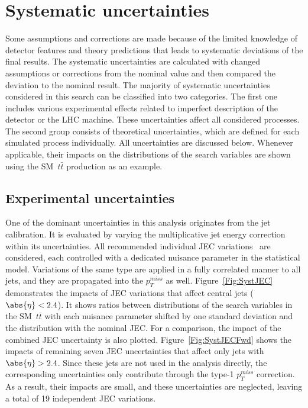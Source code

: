\section{Systematic uncertainties}
\label{Sec:Systematics}
%
Some assumptions and corrections are made because of the limited knowledge of detector features and theory predictions that leads to systematic deviations of the final results. The systematic uncertainties are calculated with changed assumptions or corrections from the nominal value and then compared the deviation to the nominal result. 
The majority of systematic uncertainties considered in this search can be classified into two categories.
The first one includes various experimental effects related to imperfect description of the detector or the LHC machine.
These uncertainties affect all considered processes.
The second group consists of theoretical uncertainties, which are defined for each simulated process individually.
All uncertainties are discussed below.
Whenever applicable, their impacts on the distributions of the search variables are shown using the SM~$t\bar t$ production as an example.


\subsection{Experimental uncertainties}

One of the dominant uncertainties in this analysis originates from the jet calibration.
It is evaluated by varying the multiplicative jet energy correction within its uncertainties.
All recommended individual JEC variations~\cite{Wiki:JECSources} are considered, each controlled with a dedicated nuisance parameter in the statistical model.
Variations of the same type are applied in a fully correlated manner to all jets, and they are propagated into the $p_{T}^{miss}$ as well.
Figure~\ref{Fig:SystJEC} demonstrates the impacts of JEC variations that affect central jets ($\abs{\eta} < 2.4$).
It shows ratios between distributions of the search variables in the SM~$t\bar t$ with each nuisance parameter shifted by one standard deviation and the distribution with the nominal JEC.
For a comparison, the impact of the combined JEC uncertainty is also plotted.
Figure~\ref{Fig:SystJECFwd} shows the impacts of remaining seven JEC uncertainties that affect only jets with $\abs{\eta} > 2.4$.
Since these jets are not used in the analysis directly, the corresponding uncertainties only contribute through the type-1 $p_{T}^{miss}$ correction.
As a result, their impacts are small, and these uncertainties are neglected, leaving a total of 19 independent JEC variations.

